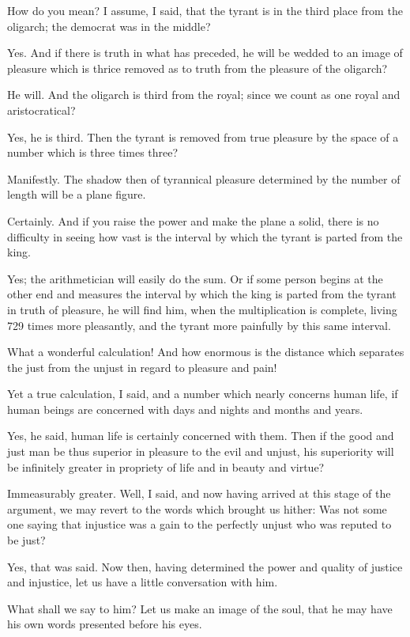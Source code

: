 How do you mean?
I assume, I said, that the tyrant is in the third place from the oligarch; the democrat was in the middle?

Yes.
And if there is truth in what has preceded, he will be wedded to an image of pleasure which is thrice removed as to truth from the pleasure of the oligarch?

He will.
And the oligarch is third from the royal; since we count as one royal and aristocratical?

Yes, he is third.
Then the tyrant is removed from true pleasure by the space of a number which is three times three?

Manifestly.
The shadow then of tyrannical pleasure determined by the number of length will be a plane figure.

Certainly.
And if you raise the power and make the plane a solid, there is no difficulty in seeing how vast is the interval by which the tyrant is parted from the king.

Yes; the arithmetician will easily do the sum.
Or if some person begins at the other end and measures the interval by which the king is parted from the tyrant in truth of pleasure, he will find him, when the multiplication is complete, living 729 times more pleasantly, and the tyrant more painfully by this same interval.

What a wonderful calculation! And how enormous is the distance which separates the just from the unjust in regard to pleasure and pain!

Yet a true calculation, I said, and a number which nearly concerns human life, if human beings are concerned with days and nights and months and years.

Yes, he said, human life is certainly concerned with them.
Then if the good and just man be thus superior in pleasure to the evil and unjust, his superiority will be infinitely greater in propriety of life and in beauty and virtue?

Immeasurably greater.
Well, I said, and now having arrived at this stage of the argument, we may revert to the words which brought us hither: Was not some one saying that injustice was a gain to the perfectly unjust who was reputed to be just?

Yes, that was said.
Now then, having determined the power and quality of justice and injustice, let us have a little conversation with him.

What shall we say to him?
Let us make an image of the soul, that he may have his own words presented before his eyes.


